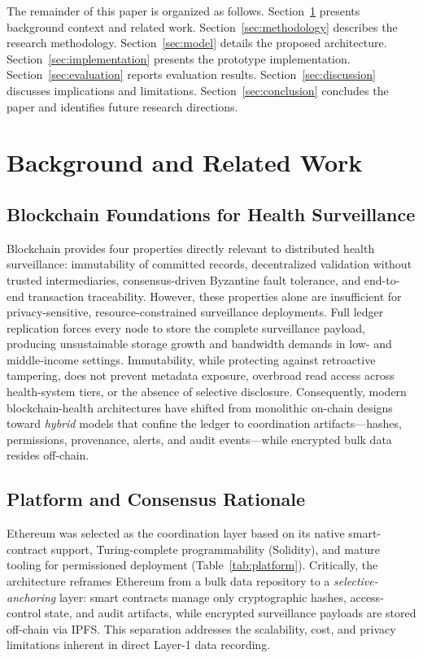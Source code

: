 \documentclass[AMA,LATO1COL]{WileyNJD-v2}
\begin{document}
The remainder of this paper is organized as follows. Section~\ref{sec:background} presents background context and related work. Section~\ref{sec:methodology} describes the research methodology. Section~\ref{sec:model} details the proposed architecture. Section~\ref{sec:implementation} presents the prototype implementation. Section~\ref{sec:evaluation} reports evaluation results. Section~\ref{sec:discussion} discusses implications and limitations. Section~\ref{sec:conclusion} concludes the paper and identifies future research directions.

\section{Background and Related Work}\label{sec:background}

\subsection{Blockchain Foundations for Health Surveillance}\label{subsec:blockchain}

Blockchain provides four properties directly relevant to distributed health surveillance: immutability of committed records, decentralized validation without trusted intermediaries, consensus-driven Byzantine fault tolerance, and end-to-end transaction traceability.\cite{yaga2018blockchain} However, these properties alone are insufficient for privacy-sensitive, resource-constrained surveillance deployments. Full ledger replication forces every node to store the complete surveillance payload, producing unsustainable storage growth and bandwidth demands in low- and middle-income settings. Immutability, while protecting against retroactive tampering, does not prevent metadata exposure, overbroad read access across health-system tiers, or the absence of selective disclosure. Consequently, modern blockchain-health architectures have shifted from monolithic on-chain designs toward \emph{hybrid} models that confine the ledger to coordination artifacts---hashes, permissions, provenance, alerts, and audit events---while encrypted bulk data resides off-chain.

\subsection{Platform and Consensus Rationale}\label{subsec:platform}

Ethereum was selected as the coordination layer based on its native smart-contract support, Turing-complete programmability (Solidity), and mature tooling for permissioned deployment (Table~\ref{tab:platform}). Critically, the architecture reframes Ethereum from a bulk data repository to a \emph{selective-anchoring} layer: smart contracts manage only cryptographic hashes, access-control state, and audit artifacts, while encrypted surveillance payloads are stored off-chain via IPFS. This separation addresses the scalability, cost, and privacy limitations inherent in direct Layer-1 data recording.
\end{document}
